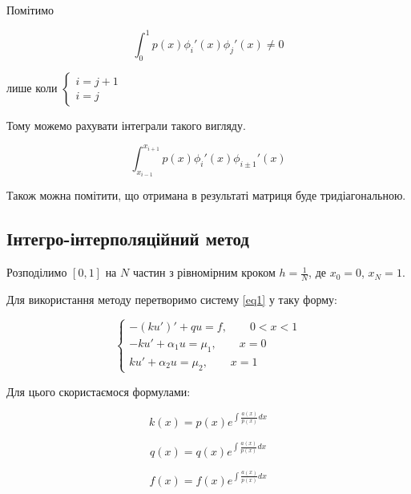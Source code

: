 \documentclass[14pt,a4paper]{scrartcl}
\begin{document}
	Помітимо
	
	\begin{equation} \label{eq5}
	\int_{0}^{1} p(x)\phi_{i}'(x)\phi_{j}'(x) \ne 0 
	\end{equation}
	
	лише коли $ \left\{
	\begin{array}{ll}
	i = j+1 \\
	i = j
	\end{array}\right.
	$
	
	Тому можемо рахувати інтеграли такого вигляду.
	
	\begin{equation} \label{eq6}
	\int_{x_{i-1}}^{x_{i+1}} p(x)\phi_{i}'(x)\phi_{i \pm 1}'(x)
	\end{equation}
	
	Також можна помітити, що отримана в результаті матриця буде тридіагональною. 
	
	\subsection{Інтегро-інтерполяційний метод}
	
	Розподілимо $[0,1]$ на $N$ частин з рівномірним кроком $h= \frac{1}{N}$, де $x_{0} = 0$, $x_{N} = 1$.
	
	Для використання методу перетворимо систему \ref{eq1} у таку форму:
	
	\begin{equation}\label{eq10}
	\left\{
	\begin{array}{ll}
		-(ku')' +qu = f,\qquad 0<x<1 \\
		-ku' + \alpha_{1}u = \mu_{1},\qquad x =0\\
		ku' + \alpha_{2}u = \mu_{2},\qquad x =1
	\end{array}\right.
	\end{equation}
	
	Для цього скористаємося формулами:
	
	\begin{equation}\label{eq11}
		k(x) = p(x)e^{\int \frac{a(x)}{p(x)} dx}
	\end{equation}

	\begin{equation}\label{eq12}
		q(x) = q(x)e^{\int \frac{a(x)}{p(x)} dx}
	\end{equation}	
	
	\begin{equation}\label{eq13}
		f(x) = f(x)e^{\int \frac{a(x)}{p(x)} dx}
	\end{equation}	
	
\end{document}
